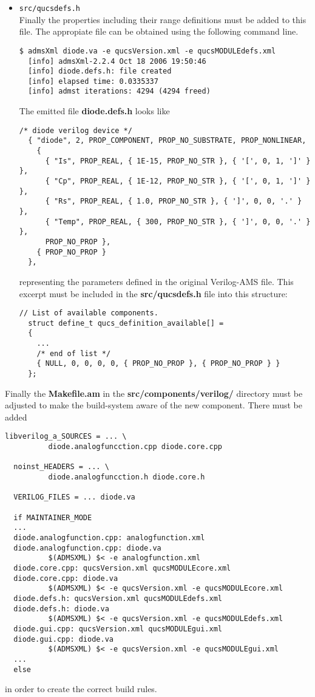 \begin{itemize}
\begin{Verbatim}[fontsize=\small]
    logprint (LOG_ERROR, "no such circuit type `%s'\n", type);
    return NULL;
  }
\end{Verbatim}
\item \Verb+src/qucsdefs.h+\\
Finally the properties including their range definitions must be added
to this file.  The appropiate file can be obtained using the following
command line.
\begin{Verbatim}[fontsize=\small]
  $ admsXml diode.va -e qucsVersion.xml -e qucsMODULEdefs.xml
  [info] admsXml-2.2.4 Oct 18 2006 19:50:46
  [info] diode.defs.h: file created
  [info] elapsed time: 0.0335337
  [info] admst iterations: 4294 (4294 freed)
\end{Verbatim}
The emitted file \textbf{diode.defs.h} looks like
\begin{Verbatim}[fontsize=\small]
  /* diode verilog device */
  { "diode", 2, PROP_COMPONENT, PROP_NO_SUBSTRATE, PROP_NONLINEAR,
    {
      { "Is", PROP_REAL, { 1E-15, PROP_NO_STR }, { '[', 0, 1, ']' } },
      { "Cp", PROP_REAL, { 1E-12, PROP_NO_STR }, { '[', 0, 1, ']' } },
      { "Rs", PROP_REAL, { 1.0, PROP_NO_STR }, { ']', 0, 0, '.' } },
      { "Temp", PROP_REAL, { 300, PROP_NO_STR }, { ']', 0, 0, '.' } },
      PROP_NO_PROP },
    { PROP_NO_PROP }
  },
\end{Verbatim}
representing the parameters defined in the original Verilog-AMS file.
This excerpt must be included in the \textbf{src/qucsdefs.h} file into
this structure:
\begin{Verbatim}[fontsize=\small]
  // List of available components.
  struct define_t qucs_definition_available[] =
  {
    ...
    /* end of list */
    { NULL, 0, 0, 0, 0, { PROP_NO_PROP }, { PROP_NO_PROP } }
  };
\end{Verbatim}
\end{itemize}

Finally the \textbf{Makefile.am} in the
\textbf{src/components/verilog/} directory must be adjusted to make
the build-system aware of the new component.  There must be added
\begin{Verbatim}[fontsize=\small]
  libverilog_a_SOURCES = ... \
          diode.analogfuncction.cpp diode.core.cpp

  noinst_HEADERS = ... \
          diode.analogfuncction.h diode.core.h

  VERILOG_FILES = ... diode.va

  if MAINTAINER_MODE
  ...
  diode.analogfunction.cpp: analogfunction.xml
  diode.analogfunction.cpp: diode.va
          $(ADMSXML) $< -e analogfunction.xml
  diode.core.cpp: qucsVersion.xml qucsMODULEcore.xml
  diode.core.cpp: diode.va
          $(ADMSXML) $< -e qucsVersion.xml -e qucsMODULEcore.xml
  diode.defs.h: qucsVersion.xml qucsMODULEdefs.xml
  diode.defs.h: diode.va
          $(ADMSXML) $< -e qucsVersion.xml -e qucsMODULEdefs.xml
  diode.gui.cpp: qucsVersion.xml qucsMODULEgui.xml
  diode.gui.cpp: diode.va
          $(ADMSXML) $< -e qucsVersion.xml -e qucsMODULEgui.xml
  ...
  else
\end{Verbatim}
in order to create the correct build rules.

